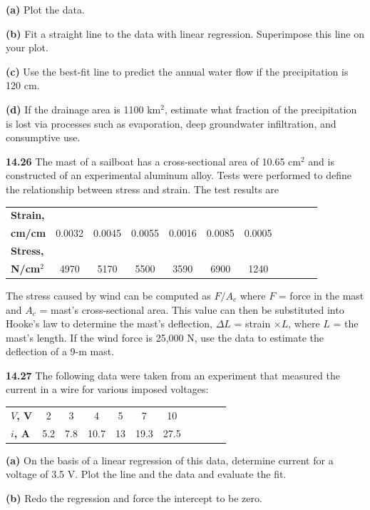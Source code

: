 \documentclass[../main.tex]{subfiles}
\begin{document}
\begin{multicols}{2}
		\noindent \textbf{(a)} Plot the data.

	\noindent \textbf{(b)} Fit a straight line to the data with linear regression.
Superimpose this line on your plot.

	\noindent \textbf{(c)} Use the best-fit line to predict the annual water flow if
the precipitation is 120 cm.

	\noindent \textbf{(d)} If the drainage area is 1100 km$^2$, estimate what fraction
of the precipitation is lost via processes such as evaporation, deep groundwater infiltration, and consumptive
use.

	\noindent\textbf{14.26}  The mast of a sailboat has a cross-sectional area of
	10.65 cm$^2$ and is constructed of an experimental aluminum
	alloy. Tests were performed to define the relationship between stress and strain. The test results are

	\noindent \begin{tabular}{l c c c c c c c c c c}
		\textbf{Strain,} \\
		\textbf{cm/cm} & 0.0032 & 0.0045 & 0.0055 & 0.0016 & 0.0085 & 0.0005 \\
		\textbf{Stress,} \\
		\textbf{N/cm$^2$} & 4970 & 5170 & 5500 & 3590 & 6900 & 1240
	\end{tabular}

	\noindent The stress caused by wind can be computed as $F/A_c$ where $F$ = force in the mast and $A_c$ = mast's cross-sectional area. This value can then be substituted into Hooke's law to determine the mast's deflection, $\Delta L$ = strain $\times L$, where $L$ = the mast's length. If the wind force is 25,000 N, use the data to estimate the deflection of a 9-m mast.

	\noindent\textbf{14.27} The following data were taken from an experiment
	that measured the current in a wire for various imposed voltages:

	\noindent \begin{tabular}{l c c c c c c c c c c}
		\textbf{$V$, V} & 2 & 3 & 4 & 5 & 7 & 10 \\
		\textbf{$i$, A} & 5.2 & 7.8 & 10.7 & 13 & 19.3 & 27.5
	\end{tabular}

	\noindent \textbf{(a)} On the basis of a linear regression of this data, determine
current for a voltage of 3.5 V. Plot the line and the data
and evaluate the fit.

\noindent \textbf{(b)} Redo the regression and force the intercept to be zero.


\end{multicols}
\end{document}
